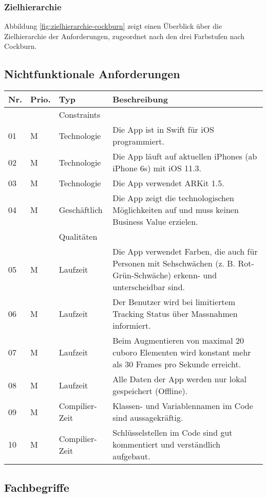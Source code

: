 \subsubsection{Zielhierarchie}
Abbildung \ref{fig:zielhierarchie-cockburn} zeigt einen Überblick über die Zielhierarchie der Anforderungen, zugeordnet nach den drei Farbstufen nach Cockburn.

\subsection{Nichtfunktionale Anforderungen}

\begin{longtable}{l l l p{10cm}}
	\hline
	\textbf{Nr.} & \textbf{Prio.} & \textbf{Typ} & \textbf{Beschreibung} \\
	\hline
	 & & Constraints & \\
	\hline
	01 & M & Technologie & Die App ist in Swift für iOS programmiert. \\
	02 & M & Technologie & Die App läuft auf aktuellen iPhones (ab iPhone 6s) mit iOS 11.3. \\
	03 & M & Technologie & Die App verwendet ARKit 1.5. \\
	04 & M & Geschäftlich & Die App zeigt die technologischen Möglichkeiten auf und muss keinen Business Value erzielen. \\
	\hline
	 & & Qualitäten & \\
	\hline
	05 & M & Laufzeit & Die App verwendet Farben, die auch für Personen mit Sehschwächen (z. B. Rot-Grün-Schwäche) erkenn- und unterscheidbar sind. \\ 
	06 & M & Laufzeit & Der Benutzer wird bei limitiertem Tracking Status über Massnahmen informiert. \\
	07 & M & Laufzeit & Beim Augmentieren von maximal 20 cuboro Elementen wird konstant mehr als 30 Frames pro Sekunde erreicht. \\
	08 & M & Laufzeit & Alle Daten der App werden nur lokal gespeichert (Offline). \\
	09 & M & Compilier-Zeit & Klassen- und Variablennamen im Code sind aussagekräftig. \\
	10 & M & Compilier-Zeit & Schlüsselstellen im Code sind gut kommentiert und verständlich aufgebaut. \\
	\hline
\end{longtable}

\subsection{Fachbegriffe}

